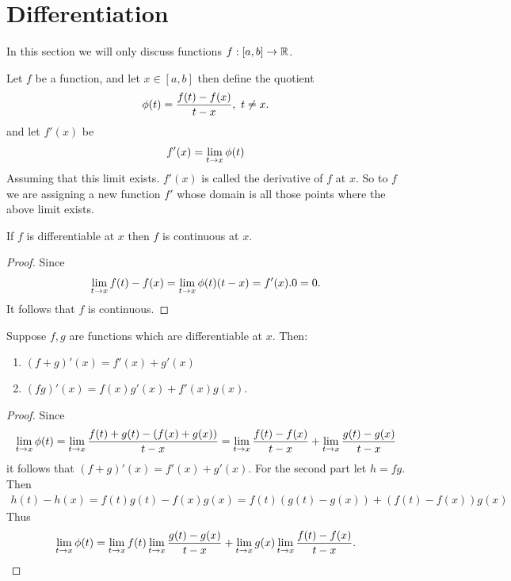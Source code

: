 \section{Differentiation}
In this section we will only discuss functions $f:[a,b]\to \mathbb{R}$.
\begin{definition}
  Let $f$ be a function, and let $x\in [a,b]$ then define the quotient
  \begin{align*}
    \phi(t) = \frac{f(t)-f(x)}{t-x},\ t\neq x. 
  \end{align*}
  and let $f'(x)$ be
  \begin{align*}
    f'(x) = \lim_{t\to x} \phi(t)
  \end{align*}
  Assuming that this limit exists. $f'(x)$ is called the derivative of $f$ at $x$. So to $f$ we are assigning a new function $f'$ whose domain is all those points where the above limit exists.
\end{definition}
\begin{proposition}
  If $f$ is differentiable at $x$ then $f$ is continuous at $x$.
\end{proposition}
\begin{proof}
  Since
  \begin{align*}
    \lim_{t\to x} f(t)-f(x) = \lim_{t\to x}\phi(t)(t-x) = f'(x).0 = 0. 
  \end{align*}
  It follows that $f$ is continuous.
\end{proof}
\begin{proposition}
  Suppose $f,g$ are functions which are differentiable at $x$. Then:
  \begin{enumerate}
    \item $(f+g)'(x) = f'(x) + g'(x)$
    \item $(fg)'(x) = f(x)g'(x) + f'(x)g(x)$.
  \end{enumerate}
\end{proposition}
\begin{proof}
  Since
  \begin{align*}
    \lim_{t\to x}\phi(t) = \lim_{t\to x} \frac{f(t)+g(t) - (f(x) + g(x))}{t-x} = \lim_{t\to x} \frac{f(t) - f(x)}{t-x} + \lim_{t\to x} \frac{g(t)-g(x)}{t-x}
  \end{align*}
  it follows that $(f+g)'(x) = f'(x) + g'(x)$. For the second part let $h = fg$. Then
  \begin{align*}
    h(t) -h(x) = f(t)g(t) - f(x)g(x) = f(t)(g(t)-g(x)) + (f(t)-f(x))g(x)
  \end{align*}
  Thus
  \begin{align*}
    \lim_{t\to x}\phi(t) = \lim_{t\to x}f(t)\lim_{t\to x}\frac{g(t)-g(x)}{t-x} + \lim_{t\to x}g(x)\lim_{t\to x}\frac{f(t)-f(x)}{t-x}.
  \end{align*}
\end{proof} 
